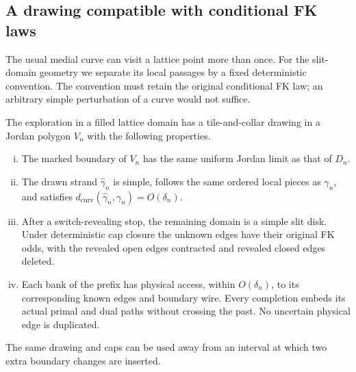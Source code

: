 \subsection{A drawing compatible with conditional FK laws}

The usual medial curve can visit a lattice point more than once. For
the slit-domain geometry we separate its local passages by a fixed
deterministic convention. The convention must retain the original
conditional FK law; an arbitrary simple perturbation of a curve would
not suffice.

\begin{lemma}\label{lem:compatible-drawing}
The exploration in a filled lattice domain has a tile-and-collar drawing
in a Jordan polygon $V_n$ with the following properties.
\begin{enumerate}[(i)]
\item The marked boundary of $V_n$ has the same uniform Jordan limit
as that of $D_n$.
\item The drawn strand $\widehat\gamma_n$ is simple, follows the same
ordered local pieces as $\gamma_n$, and satisfies
$d_{\mathrm{curv}}(\widehat\gamma_n,\gamma_n)=O(\delta_n)$.
\item After a switch-revealing stop, the remaining domain is a simple
slit disk. Under deterministic cap closure the unknown edges have
their original FK odds, with the revealed open edges contracted and
revealed closed edges deleted.
\item Each bank of the prefix has physical access, within $O(\delta_n)$,
to its corresponding known edges and boundary wire. Every completion
embeds its actual primal and dual paths without crossing the past.
No uncertain physical edge is duplicated.
\end{enumerate}
The same drawing and caps can be used away from an interval at which
two extra boundary changes are inserted.
\end{lemma}

